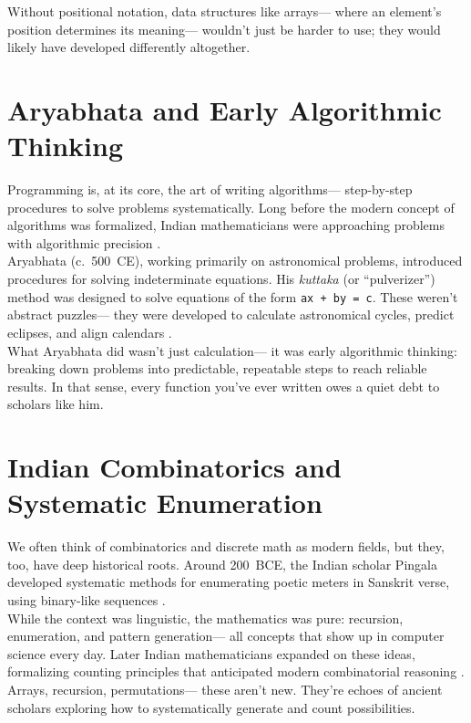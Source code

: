 Without positional notation, data structures like arrays---%
where an element’s position determines its meaning---%
wouldn’t just be harder to use; they would likely have developed differently altogether.

\section{Aryabhata and Early Algorithmic Thinking}
Programming is, at its core, the art of writing algorithms---%
step-by-step procedures to solve problems systematically. Long before the modern concept of algorithms was formalized, Indian mathematicians were approaching problems with algorithmic precision \cite{vajiram_ravi}.\\

Aryabhata (c.~500~CE), working primarily on astronomical problems, introduced procedures for solving indeterminate equations. His \emph{kuttaka} (or ``pulverizer'') method was designed to solve equations of the form \texttt{ax + by = c}. These weren’t abstract puzzles---%
they were developed to calculate astronomical cycles, predict eclipses, and align calendars \cite{mj_college}.\\

What Aryabhata did wasn’t just calculation---%
it was early algorithmic thinking: breaking down problems into predictable, repeatable steps to reach reliable results. In that sense, every function you’ve ever written owes a quiet debt to scholars like him.

\section{Indian Combinatorics and Systematic Enumeration}
We often think of combinatorics and discrete math as modern fields, but they, too, have deep historical roots. Around 200~BCE, the Indian scholar Pingala developed systematic methods for enumerating poetic meters in Sanskrit verse, using binary-like sequences \cite{ukessays_indian_math}.\\

While the context was linguistic, the mathematics was pure: recursion, enumeration, and pattern generation---%
all concepts that show up in computer science every day. Later Indian mathematicians expanded on these ideas, formalizing counting principles that anticipated modern combinatorial reasoning \cite{mj_college}.\\

Arrays, recursion, permutations---%
these aren’t new. They’re echoes of ancient scholars exploring how to systematically generate and count possibilities.